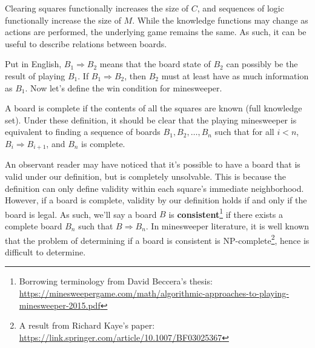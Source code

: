 \defn{Natural Board}{\index{Board!natural}
A minesweeper board is \textbf{natural} if $\forall a\in\mathcal{A}$, $N(a)\in\mathbb{Z}$ if and only if $a\in[0,c)\times[0,r)$ and $C(a)=1$.
}

Clearing squares functionally increases the size of $C$, and sequences of logic functionally increase the size of $M$. While the knowledge functions may change as actions are performed, the underlying game remains the same. As such, it can be useful to describe relations between boards.


Put in English, $B_1\Rightarrow B_2$ means that the board state of $B_2$ can possibly be the result of playing $B_1$. If $B_1\Rightarrow B_2$, then $B_2$ must at least have as much information as $B_1$. Now let's define the win condition for minesweeper.


A board is complete if the contents of all the squares are known (full knowledge set). Under these definition, it should be clear that the playing minesweeper is equivalent to finding a sequence of boards $B_1,B_2,\dots,B_n$ such that for all $i<n$, $B_i\Rightarrow B_{i+1}$, and $B_n$ is complete.

An observant reader may have noticed that it's possible to have a board that is valid under our definition, but is completely unsolvable. This is because the definition can only define validity within each square's immediate neighborhood. However, if a board is complete, validity by our definition holds if and only if the board is legal. As such, we'll say a board $B$ is \textbf{consistent}\footnote{Borrowing terminology from David Beccera's thesis: \\\url{https://minesweepergame.com/math/algorithmic-approaches-to-playing-minesweeper-2015.pdf}} if there exists a complete board $B_n$ such that $B\Rightarrow B_n$. In minesweeper literature, it is well known that the problem of determining if a board is consistent is NP-complete\footnote{A result from Richard Kaye's paper: \url{https://link.springer.com/article/10.1007/BF03025367}}, hence is difficult to determine.

